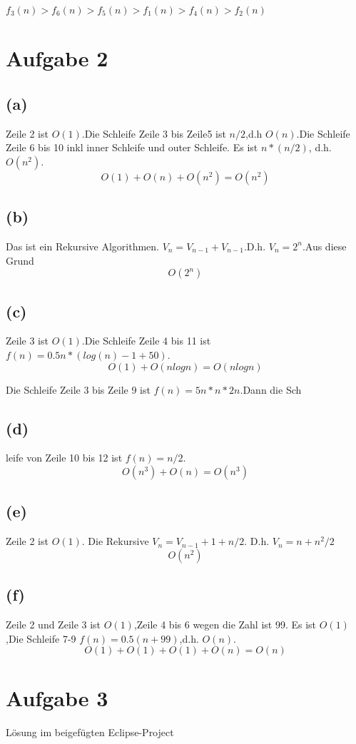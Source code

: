 \documentclass{article}
\begin{document}
$f_3(n)>f_6(n)>f_5(n)>f_1(n)>f_4(n)>f_2(n)$

\section{Aufgabe 2}
\subsection*{(a)}
    Zeile 2 ist $O(1)$.Die Schleife Zeile 3 bis Zeile5 ist $n/2$,d.h $O(n)$.Die Schleife Zeile 6 bis 10 inkl inner Schleife und outer Schleife. Es ist $n*(n/2)$, d.h. $O(n^2)$. \\
    \[O(1)+O(n)+O(n^2)=O(n^2)\]
\subsection*{(b)}
    Das ist ein Rekursive Algorithmen. $V_n=V_{n-1}+V_{n-1}$.D.h. $V_n=2^n$.Aus diese Grund 
    \[O(2^n)\]
\subsection*{(c)}
    Zeile 3 ist $O(1)$.Die Schleife Zeile 4 bis 11 ist $f(n)=0.5n*(log(n)-1+50)$.\\
    \[O(1)+O(nlogn)=O(nlogn)\]

    Die Schleife Zeile 3 bis Zeile 9 ist $f(n)=5n*n*2n$.Dann die Sch\subsection*{(d)}leife von Zeile 10 bis 12 ist $f(n)=n/2$.
    \[O(n^3)+O(n)=O(n^3)\]
\subsection*{(e)}
Zeile 2 ist $O(1)$. Die Rekursive $V_n=V_{n-1}+1+n/2$. D.h. $V_n=n+n^2/2$
\[O(n^2)\]
\subsection*{(f)}
Zeile 2 und Zeile 3 ist $O(1)$,Zeile 4 bis 6 wegen die Zahl ist 99. Es ist $O(1)$,Die Schleife 7-9 $f(n)=0.5(n+99)$,d.h. $O(n)$.
\[O(1)+O(1)+O(1)+O(n)=O(n)\]
\section{Aufgabe 3}
Lösung im beigefügten Eclipse-Project
\end{document}
